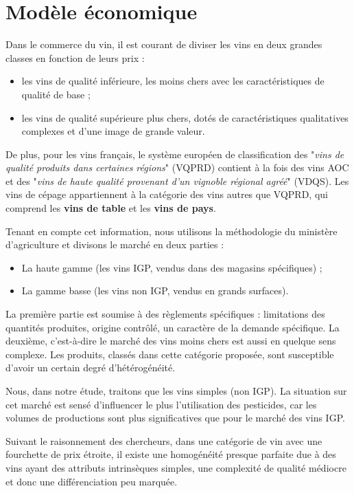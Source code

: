 \documentclass[11pt, a4paper]{article}
\begin{document}
\section*{Modèle économique}
Dans le commerce du vin, il est courant de diviser les vins en deux grandes classes en fonction de leurs prix : 
\begin{itemize}
    \item les vins de qualité inférieure, les moins chers avec les caractéristiques de qualité de base ;
    \item les vins de qualité supérieure plus chers, dotés de caractéristiques qualitatives complexes et d'une image de grande valeur.
\end{itemize} %
De plus, pour les vins français, le système européen de classification des "\textit{vins de qualité produits dans certaines régions}" (VQPRD) contient à la fois des vins AOC et des "\textit{vins de haute qualité provenant d'un vignoble régional agréé}" (VDQS). 
Les vins de cépage appartiennent à la catégorie des vins autres que VQPRD, qui comprend les \textbf{vins de table} et les \textbf{vins de pays}.
\par
Tenant en compte cet information, nous utilisons la méthodologie du ministère d'agriculture et divisons le marché en deux parties :
\begin{itemize}
    \item La haute gamme (les vins IGP, vendus dans des magasins spécifiques) ;
    \item La gamme basse (les vins non IGP, vendus en grands surfaces).
\end{itemize}
La première partie est soumise à des règlements spécifiques : limitations des quantités produites, origine contrôlé, un caractère de la demande spécifique. 
La deuxième, c'est-à-dire le marché des vins moins chers est aussi en quelque sens complexe. Les produits, classés dans cette catégorie proposée, sont susceptible d'avoir un certain degré d'hétérogénéité.
\par
Nous, dans notre étude, traitons que les vins simples (non IGP). 
La situation sur cet marché est sensé d'influencer le plus l'utilisation des pesticides, car les volumes de productions sont plus significatives que pour le marché des vins IGP.
\par 
Suivant le raisonnement des chercheurs, dans une catégorie de vin avec une fourchette de prix étroite, il existe une homogénéité presque parfaite due à des vins ayant des attributs intrinsèques simples, une complexité de qualité médiocre et donc une différenciation peu marquée.
\end{document}
